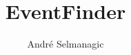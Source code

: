 

\author{André Selmanagic}
\title{EventFinder}







\addtocounter{page}{-2}





%
%
%

\newpage
\listoffigures
\newpage
\lstlistoflistings


